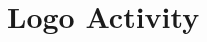 \section{Logo Activity}

\begin{lstlisting}[style=sourceCode, language=JAVA, caption=This is code, label=lst:logoActivity] 

\end{lstlisting}